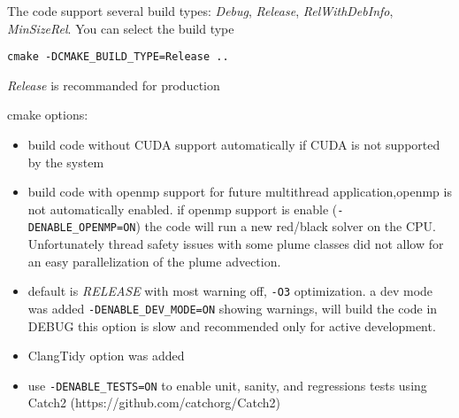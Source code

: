 The code support several build types: \textit{Debug}, \textit{Release}, \textit{RelWithDebInfo}, \textit{MinSizeRel}. You can select the build type
\begin{verbatim}
cmake -DCMAKE_BUILD_TYPE=Release ..
\end{verbatim}
\textit{Release} is recommanded for production

cmake options:
\begin{itemize}
    \item build code without CUDA support automatically if CUDA is not supported by the system
	\item build code with openmp support for future multithread application,openmp is not automatically enabled. if openmp support is enable (\verb|-DENABLE_OPENMP=ON|) the code will run a new red/black solver on the CPU. Unfortunately thread safety issues with some plume classes did not allow for an easy parallelization of the plume advection.
	\item default is \textit{RELEASE} with most warning off, \verb|-O3| optimization.
a dev mode was added \verb|-DENABLE_DEV_MODE=ON| showing warnings, will build the code in DEBUG this option is slow and recommended only for active development.
	\item ClangTidy option was added
	\item use \verb|-DENABLE_TESTS=ON| to enable unit, sanity, and regressions tests using Catch2 (https://github.com/catchorg/Catch2)
\end{itemize}
